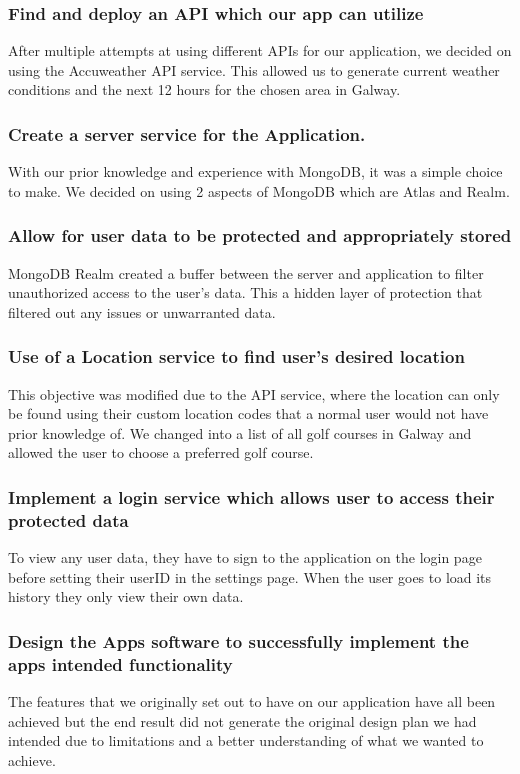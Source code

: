 \subsubsection {Find and deploy an API which our app can utilize}
After multiple attempts at using different APIs for our application, we decided on using the Accuweather API service. This allowed us to generate current weather conditions and the next 12 hours for the chosen area in Galway.
\subsubsection {Create a server service for the Application.}
With our prior knowledge and experience with MongoDB, it was a simple choice to make. We decided on using 2 aspects of MongoDB which are Atlas and Realm.
\subsubsection {Allow for user data to be protected and appropriately stored}
MongoDB Realm created a buffer between the server and application to filter unauthorized access to the user’s data. This a hidden layer of protection that filtered out any issues or unwarranted data.
\subsubsection {Use of a Location service to find user's desired location}
This objective was modified due to the API service, where the location can only be found using their custom location codes that a normal user would not have prior knowledge of. We changed into a list of all golf courses in Galway and allowed the user to choose a preferred golf course.
\subsubsection {Implement a login service which allows user to access their \newline protected data}
To view any user data, they have to sign to the application on the login page before setting their userID in the settings page. When the user goes to load its history they only view their own data.
\subsubsection {Design the Apps software to successfully implement the apps intended functionality}
The features that we originally set out to have on our application have all been achieved but the end result did not generate the original design plan we had intended due to limitations and a better understanding of what we wanted to achieve.

